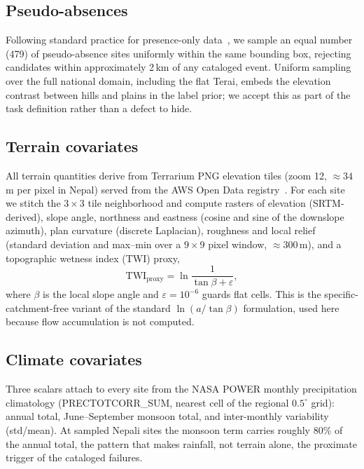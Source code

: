 \documentclass[11pt,a4paper]{article}
\begin{document}
\subsection{Pseudo-absences}
Following standard practice for presence-only
data~\cite{brenning2005}, we sample an equal number (479) of pseudo-absence
sites uniformly within the same bounding box, rejecting candidates within
approximately 2\,km of any cataloged event. Uniform sampling over the full
national domain, including the flat Terai, embeds the elevation contrast
between hills and plains in the label prior; we accept this as part of the
task definition rather than a defect to hide.

\subsection{Terrain covariates}
All terrain quantities derive from Terrarium PNG elevation tiles (zoom 12,
$\approx 34$\,m per pixel in Nepal) served from the AWS Open Data
registry~\cite{terrarium}. For each site we stitch the $3\times3$ tile
neighborhood and compute rasters of elevation (SRTM-derived), slope angle,
northness and eastness (cosine and sine of the downslope azimuth), plan
curvature (discrete Laplacian), roughness and local relief (standard deviation
and max--min over a $9\times9$ pixel window, $\approx 300$\,m), and a
topographic wetness index (TWI) proxy,
\begin{equation}
\mathrm{TWI}_{\text{proxy}} = \ln\!\frac{1}{\tan\beta + \varepsilon},
\label{eq:twi}
\end{equation}
where $\beta$ is the local slope angle and $\varepsilon = 10^{-6}$ guards flat
cells. This is the specific-catchment-free variant of the standard
$\ln(a/\tan\beta)$ formulation, used here because flow accumulation is not
computed.

\subsection{Climate covariates}
Three scalars attach to every site from the NASA POWER monthly precipitation
climatology (PRECTOTCORR\_SUM, nearest cell of the regional $0.5^\circ$ grid):
annual total, June--September monsoon total, and inter-monthly variability
(std/mean). At sampled Nepali sites the monsoon term carries roughly 80\% of
the annual total, the pattern that makes rainfall, not terrain alone, the
proximate trigger of the cataloged failures.
\end{document}

